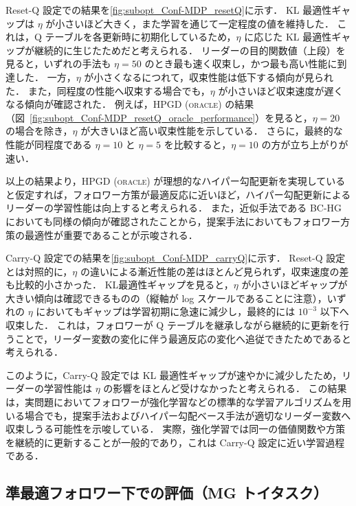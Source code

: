 \documentclass[originalpaper,fleqn]{jsaiart}     %
\begin{document}
Reset-Q 設定での結果を\ref{fig:subopt_Conf-MDP_resetQ}に示す．
KL 最適性ギャップは $\eta$ が小さいほど大きく，また学習を通じて一定程度の値を維持した．
これは，Q テーブルを各更新時に初期化しているため，$\eta$ に応じた KL 最適性ギャップが継続的に生じたためだと考えられる．
リーダーの目的関数値（上段）を見ると，いずれの手法も $\eta=50$ のとき最も速く収束し，かつ最も高い性能に到達した．
一方，$\eta$ が小さくなるにつれて，収束性能は低下する傾向が見られた．
また，同程度の性能へ収束する場合でも，$\eta$ が小さいほど収束速度が遅くなる傾向が確認された．
例えば，\textsc{HPGD (oracle)} の結果（図~\ref{fig:subopt_Conf-MDP_resetQ_oracle_performance}）を見ると，$\eta=20$ の場合を除き，$\eta$ が大きいほど高い収束性能を示している．
さらに，最終的な性能が同程度である $\eta=10$ と $\eta=5$ を比較すると，$\eta=10$ の方が立ち上がりが速い．

以上の結果より，\textsc{HPGD (oracle)} が理想的なハイパー勾配更新を実現していると仮定すれば，フォロワー方策が最適反応に近いほど，ハイパー勾配更新によるリーダーの学習性能は向上すると考えられる．
また，近似手法である \textsc{BC-HG} においても同様の傾向が確認されたことから，提案手法においてもフォロワー方策の最適性が重要であることが示唆される．

Carry-Q 設定での結果を\ref{fig:subopt_Conf-MDP_carryQ}に示す．
Reset-Q 設定とは対照的に，$\eta$ の違いによる漸近性能の差はほとんど見られず，収束速度の差も比較的小さかった．
KL最適性ギャップを見ると，$\eta$ が小さいほどギャップが大きい傾向は確認できるものの（縦軸が log スケールであることに注意），いずれの $\eta$ においてもギャップは学習初期に急速に減少し，最終的には $10^{-3}$ 以下へ収束した．
これは，フォロワーが Q テーブルを継承しながら継続的に更新を行うことで，リーダー変数の変化に伴う最適反応の変化へ追従できたためであると考えられる．

このように，Carry-Q 設定では KL 最適性ギャップが速やかに減少したため，リーダーの学習性能は $\eta$ の影響をほとんど受けなかったと考えられる．
この結果は，実問題においてフォロワーが強化学習などの標準的な学習アルゴリズムを用いる場合でも，提案手法およびハイパー勾配ベース手法が適切なリーダー変数へ収束しうる可能性を示唆している．
実際，強化学習では同一の価値関数や方策を継続的に更新することが一般的であり，これは Carry-Q 設定に近い学習過程である．

\subsection{準最適フォロワー下での評価（MG トイタスク）}\label{sec:exp_subopt_MG_dicrete}
\end{document}
